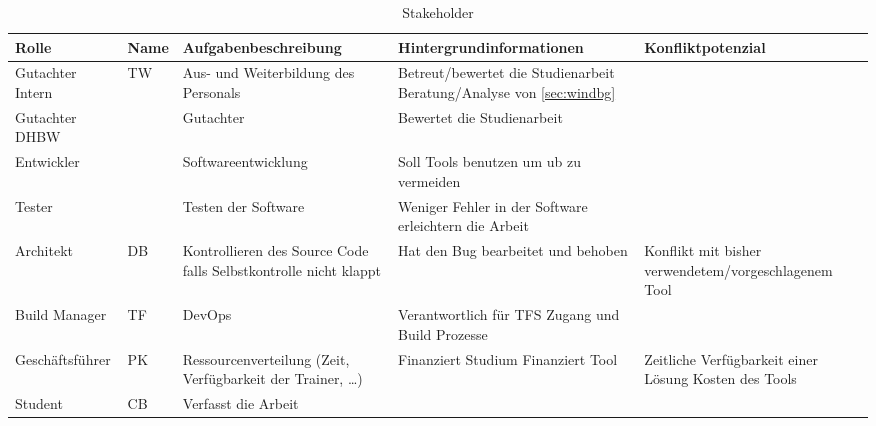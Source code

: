 \begin{table}[H]
    {
        \tiny
        \begin{tabularx}{\linewidth}{|X|X|X|X|X|}
            \hline
            Rolle
             & Name
             & Aufgabenbeschreibung
             & Hintergrundinformationen
             & Konfliktpotenzial
            \\
            \hline
            \cline{1-5}
            Gutachter Intern
             & TW
             & Aus- und Weiterbildung des Personals
             & Betreut/bewertet die Studienarbeit \newline
            Beratung/Analyse von \ref{sec:windbg}
             &
            \\
            \cline{1-5}
            Gutachter DHBW
             &
             & Gutachter
             & Bewertet die Studienarbeit
             &
            \\
            \cline{1-5}
            Entwickler
             &
             & Softwareentwicklung
             & Soll Tools benutzen um \gls{ub} zu vermeiden
             &
            \\
            \cline{1-5}
            Tester
             &
             & Testen der Software
             & Weniger Fehler in der Software erleichtern die Arbeit
             &
            \\
            \cline{1-5}
            Architekt
             & DB
             & Kontrollieren des Source Code falls Selbstkontrolle nicht klappt
             & Hat den Bug bearbeitet und behoben
             & Konflikt mit bisher verwendetem/vorgeschlagenem Tool
            \\
            \cline{1-5}
            Build Manager
             & TF
             & DevOps
             & Verantwortlich für TFS Zugang und Build Prozesse
             &
            \\
            \cline{1-5}
            Geschäftsführer
             & PK
             & Ressourcenverteilung (Zeit, Verfügbarkeit der Trainer, \dots)
             & Finanziert Studium \newline
            Finanziert Tool
             & Zeitliche Verfügbarkeit einer Lösung \newline
            Kosten des Tools
            \\
            \cline{1-5}
            Student
             & CB
             & Verfasst die Arbeit
             &
             &
            \\
            \hline
        \end{tabularx}
    }
    \caption{Stakeholder}
    \label{tab:stakeholder}
\end{table}

